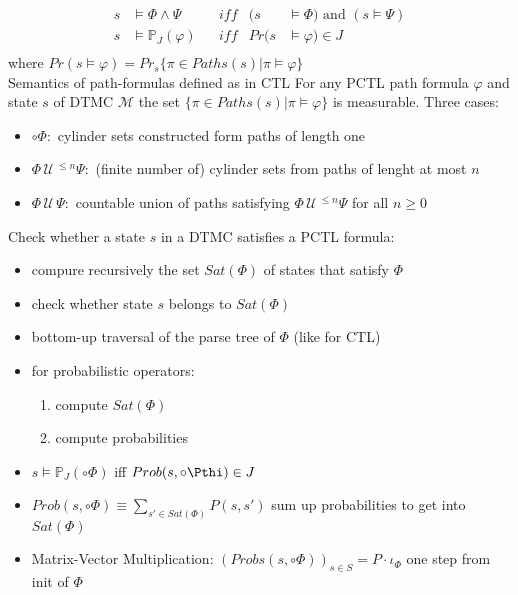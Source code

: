 \documentclass[a4paper, 10pt]{article}
\newcommand{\until}{\,\mathcal{U}\,}
\begin{document}
\begin{mdframed}
\begin{align*}
s&\models \Phi\wedge\Psi && iff & (s&\models\Phi) \text{ and } (s\models\Psi)\\
s&\models \mathbb{P}_J(\varphi) && iff & Pr(s&\models\varphi)\in J\\
\end{align*}
where $Pr(s\models\varphi)=Pr_s\{\pi\in Paths(s)|\pi\models\varphi\}$ \\
Semantics of path-formulas defined as in CTL
For any PCTL path formula $\varphi$ and state $s$ of DTMC $\mathcal{M}$ the set $\{\pi\in Paths(s) | \pi\models\varphi\}$ is measurable. Three cases:
\begin{itemize}
    \item $\circ\Phi:$ cylinder sets constructed form paths of length one
    \item $\Phi\until^{\leq n}\Psi:$ (finite number of) cylinder sets from paths of lenght at most $n$
    \item $\Phi\until\Psi:$ countable union of paths satisfying $\Phi\until^{\leq n}\Psi$ for all $n\geq0$
\end{itemize}
Check whether a state $s$ in a DTMC satisfies a PCTL formula:
\begin{itemize}
    \item compure recursively the set $Sat(\Phi)$ of states that satisfy $\Phi$
    \item check whether state $s$ belongs to $Sat(\Phi)$
    \item[\follows] bottom-up traversal of the parse tree of $\Phi$ (like for CTL)
    \item for probabilistic operators:
    \begin{enumerate}
        \item compute $Sat(\Phi)$
        \item compute probabilities
    \end{enumerate}
\end{itemize}
\begin{itemize}
    \item $s\models\mathbb{P}_J(\circ\Phi)$ iff $Prob(s,\circ\Pthi)\in J$
    \item $Prob(s,\circ\Phi)\equiv\displaystyle\sum_{s'\in Sat(\Phi)}P(s,s')$ {\tiny sum up probabilities to get into $Sat(\Phi)$}
    \item Matrix-Vector Multiplication: $(Probs(s,\circ\Phi))_{s\in S}=P\cdot\iota_\Phi$ {\tiny one step from init of $\Phi$}
\end{itemize}

\end{mdframed}
\end{document}
